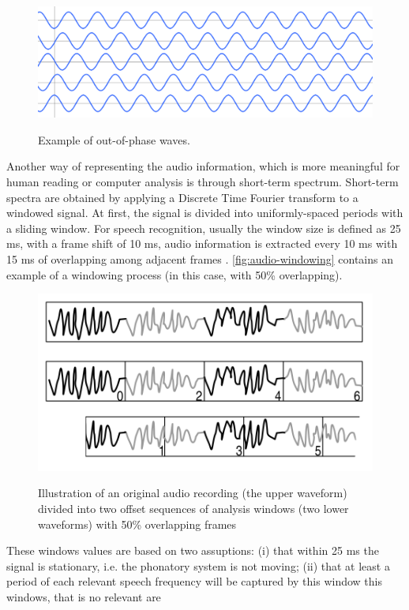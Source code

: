 \begin{figure}[!h]
        \myfloatalign
        {\includegraphics[width=.66\linewidth]{gfx/out-of-phase-waves.png}}
        \caption{Example of out-of-phase waves.}
        \label{fig:out-of-phase-waves}
\end{figure}

Another way of representing the audio information, which is more meaningful for human reading
or computer analysis is through short-term spectrum. Short-term spectra are obtained by applying
a Discrete Time Fourier transform to a windowed signal. At first, the signal is divided
into uniformly-spaced periods with a sliding window. For speech recognition, usually the window size is defined as 25 ms, 
with a frame shift of 10 ms, audio information is extracted every 10 ms with 15 ms of overlapping
among adjacent frames \cite{Huang2001}. \autoref{fig:audio-windowing} contains an example of a windowing process (in this case, 
with 50\% overlapping).

\begin{figure}[!h]
        \myfloatalign
        {\includegraphics[width=.66\linewidth]{gfx/audio-windowing.png}}
        \caption{Illustration of an original audio recording (the upper waveform) divided into two
offset sequences of analysis windows (two lower waveforms) with 50\% overlapping frames \cite{McLoughlin2009}}
        \label{fig:audio-windowing}
\end{figure}

These windows values are based on two assuptions: (i) that within 25 ms the signal is stationary, i.e.
the phonatory system is not moving; (ii) that at least a period of each relevant speech frequency will 
be captured by this window
this windows, that is no relevant are 

